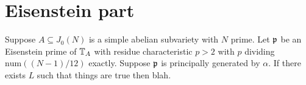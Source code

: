 \documentclass[thesis.tex]{subfiles}
\begin{document}



\section{Eisenstein part}%
\label{sec:eisenstein_part}

\begin{corollary}
    Suppose $A\subseteq J_0(N)$ is a simple abelian subvariety with $N$ prime.
    Let $\mathfrak{p}$ be an Eisenstein prime of $\mathbb{T}_A$ with residue characteristic
    $p>2$ with $p$ dividing $\mathrm{num}((N-1)/12)$ exactly. Suppose $\mathfrak{p}$ is
    principally generated by $\alpha$. If there exists $L$ such that things are
    true then blah.
\end{corollary}
\end{document}
